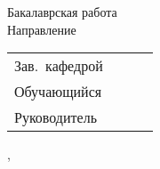 \thispagestyle{empty}
\begin{center}
\thesisOrganization
\end{center}

%
\vspace{0pt plus1fill} %
\begin{center}
{\thesisFacultyTitle} \\
{\thesisCafedrTitle} \\
{\thesisProfileTitle}
\end{center}
%
\vspace{0pt plus3fill} %
\begin{center}
\textbf { %
\thesisTitle}

\vspace{0pt plus2fill} %
{%
Бакалаврская работа \\
Направление \thesisSpecialtyNumber \space
\thesisSpecialtyTitle
}

\vspace{0pt plus2fill} %
\end{center}
%
\vspace{0pt plus6fill} %
\begin{flushright}
	\begin{tabular}{lclr}
		Зав.~кафедрой 	& \underline{\hspace{3cm}} 	& \genCafedraRegaliaShort 	& \genCafedraFIOShort 	\\
		Обучающийся 	& \underline{\hspace{3cm}} 	&   						& \thesisAuthorShort 	\\
		Руководитель 	& \underline{\hspace{3cm}} 	& \supervisorRegaliaShort	& \supervisorFioShort 	\\
	\end{tabular}
	
\end{flushright}
%
\vspace{0pt plus2fill} %
{\centering\thesisCity,~\thesisYear\par}
